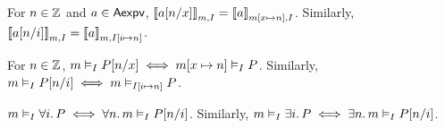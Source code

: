 \begin{lemma}
For $n \in \mathbb{Z}$ and $a \in \mathsf{Aexpv}$,
$\EvalI(a[n/x],m,I) = \EvalI(a,m[x \mapsto n],I)$.
Similarly,
$\EvalI(a[n/i],m,I) = \EvalI(a,m,I[i \mapsto n])$.
\end{lemma}

\begin{lemma}
For $n \in \mathbb{Z}$,
$\AVAL m | I |- P[n/x] \iff \AVAL m[x \mapsto n] | I |- P$.
Similarly,
$\AVAL m | I |- P[n/i] \iff \AVAL m | I[i \mapsto n] |- P$.
\end{lemma}

\begin{corollary}
$\AVALmi \forall i.\, P \iff \forall n.\, \AVALmi P[n/i]$.
Similarly,
$\AVALmi \exists i.\, P \iff \exists n.\, \AVALmi P[n/i]$.
\end{corollary}

\iffalse
We define the \emph{interpretation} of $P,Q \in \DomAssert$
to yield the subset of memories
in which the assertion holds:
$\Interp P \triangleq \SetBuild(m | {\Eval(P,m) = \True})$.
Properties of interpretation include (all proven in Coq):
%
\begin{mathpar}
\begin{array}{rcl}
\Interp{\neg P} & = & \complement{\Interp{P}} \\
\Interp{P \wedge Q} & = & \Interp{P} \cap \Interp{Q} \\
\Interp{P \vee Q} & = & \Interp{P} \cup \Interp{Q}
\end{array}
\and
\begin{array}{rcl}
\Interp{P \Rightarrow Q} & = & \complement{\Interp P} \cup \Interp{Q} \\
\Interp{\ETrue} & = & \Mems  \\
\Interp{\EFalse} & = & \emptyset
\end{array}
\end{mathpar}

A boolean expression is \emph{valid},
denoted $\VAL P$,
if $P$ always yields $\True$,
i.e.\ $\Interp P = \Mems$.
Properties include:
{
%
\newcommand*{\LINE}[3]{%
    \VAL #1 & \text{#3} & #2 \\ %
}
%
\begin{mathpar}
{\BIIMP\inferrule*[right=Val-$\wedge$]{
    \VAL P \\ \VAL Q
}{
    \VAL P \wedge Q
}}
%
\and
%
\inferrule*[right=Val-$\vee_\textsc{L}$]{
    \VAL P
}{
    \VAL P \vee Q
}
%
\and
%
\inferrule*[right=Val-$\vee_\textsc{R}$]{
    \VAL Q
}{
    \VAL P \vee Q
}
%
\and
{\BIIMP\inferrule*[right=Val-$\Rightarrow$]{
    \Interp P \subseteq \Interp Q
}{
    \VAL P \Rightarrow Q
}}
\end{mathpar}
}
\fi

